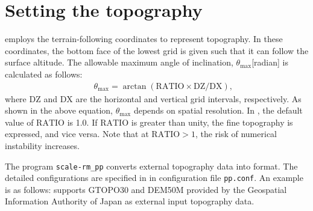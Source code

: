 \section{Setting the topography} \label{subsec:basic_usel_topo}

\scalerm employs the terrain-following coordinates to represent topography.
In these coordinates, the bottom face of the lowest grid is given such that it can follow the surface altitude. The allowable maximum angle of inclination, $\theta_{\max}$[radian] is calculated as follows: 
\begin{eqnarray}
  && \theta_{\max} = \arctan( \mathrm{RATIO} \times \mathrm{DZ}/\mathrm{DX} )\nonumber,
\end{eqnarray}
where $\mathrm{DZ}$ and $\mathrm{DX}$ are the horizontal and vertical grid intervals, respectively.  As shown in the above equation, $\theta_{\max}$ depends on spatial resolution. 
In \scalerm, the default value of $\mathrm{RATIO}$ is 1.0.
If $\mathrm{RATIO}$ is greater than unity, the fine topography is expressed, and vice versa. Note that at $\mathrm{RATIO} >1$, the risk of numerical instability increases.

The program \verb|scale-rm_pp| converts external topography data into \scalelib format.  The detailed configurations are specified in  in configuration file \verb|pp.conf|. An example is as follows:
\scalerm supports GTOPO30 and DEM50M provided by the Geospatial Information Authority of Japan as external input topography data.

